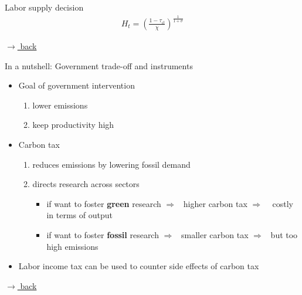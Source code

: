 \documentclass[11pt,aspectratio=169]{beamer}
\newcommand{\ar}{$\Rightarrow$ \ }
\begin{document}
\appendix

\begin{frame}{Labor supply decision}
\hypertarget{labsup}{}
\begin{align*}
	H_t=\left(\frac{1-\tau_{\iota t}}{\chi}\right)^{\frac{1}{1+\sigma}}
\end{align*}

\vfill
\vspace{0mm}
\hfill 
\hyperlink{hhopt}{\tiny{$\rightarrow$ back}}
\end{frame}




\begin{frame}{In a nutshell: Government trade-off and instruments}
\hypertarget{govProb}{}
\begin{itemize}
	\item 	Goal of government intervention
	\begin{enumerate}
		\item[a)] lower emissions
		\item[b)] keep productivity high
	\end{enumerate}
	\vspace{3mm}
	\item Carbon tax
	\begin{enumerate}
		\item[a)] reduces emissions by lowering fossil demand
		\item[b)] directs research across sectors
		\begin{itemize}
			\item[-] if want to foster \textbf{green} research
			\ar higher carbon tax \ar %
			costly in terms of output %
			\item[-] if want to foster \textbf{fossil} research \ar smaller carbon tax \ar but too high emissions
		\end{itemize}
	\end{enumerate}
	\item Labor income tax can be used to counter side effects of carbon tax 
\end{itemize}

\vspace{5mm}
\hfill	\hyperlink{calback}{\tiny{$\rightarrow$ back}}
\end{frame}
\end{document}

